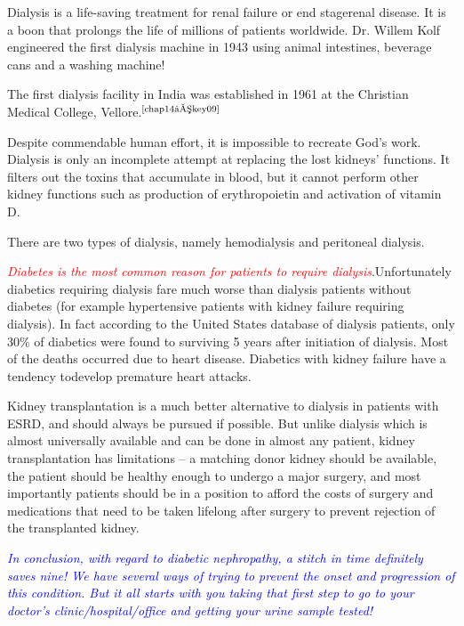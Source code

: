 
Dialysis is a life-saving treatment for renal failure or end stage\break renal disease. It is a boon that prolongs the life of millions of patients worldwide. Dr. Willem Kolf engineered the first dialysis machine in 1943 using animal intestines, beverage cans and a washing machine!

The first dialysis facility in India was established in 1961 at the Christian Medical College, Vellore.$^{\text{\cite{chap14–key09}}}$

Despite commendable human effort, it is impossible to recreate God’s work. Dialysis is only an incomplete attempt at replacing the lost kidneys’ functions. It filters out the toxins that accumulate in blood, but it cannot perform other kidney functions such as production of erythropoietin and activation of vitamin D.

There are two types of dialysis, namely hemodialysis and peritoneal dialysis.

\textcolor{red}{\textit{Diabetes is the most common reason for patients to require dialysis}}.\break Unfortunately diabetics requiring dialysis fare much worse than dia\-lysis patients without diabetes (for example hypertensive patients with kidney failure requiring dialysis). In fact according to the United States database of dialysis patients, only 30\% of diabetics were found to survi\-ving 5 years after initiation of dialysis. Most of the deaths occurred due to heart disease. Diabetics with kidney failure have a tendency to\break develop premature heart attacks.


Kidney transplantation is a much better alternative to dialysis in patients with ESRD, and should always be pursued if possible. But unlike dialysis which is almost universally available and can be done in almost any patient, kidney transplantation has limitations – a matching donor kidney should be available, the patient should be healthy enough to undergo a major surgery, and most importantly patients should be in a position to afford the costs of surgery and medications that need to be taken lifelong after surgery to prevent rejection of the transplanted kidney.

\textcolor{blue}{\textit{In conclusion, with regard to diabetic nephropathy, a stitch in time defi\-nitely saves nine! We have several ways of trying to prevent the onset and progression of this condition. But it all starts with you taking that first step to go to your doctor’s clinic/hospital/office and getting your urine sample tested!}}

